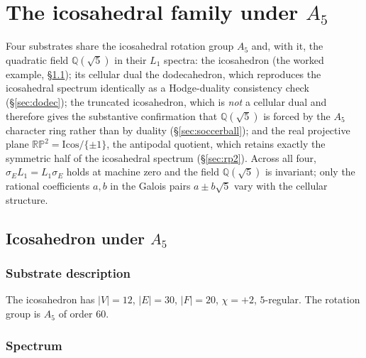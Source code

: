 \documentclass[12pt,a4paper]{article}
\theoremstyle{definition}
\theoremstyle{remark}
\newcommand{\bQ}{\mathbb{Q}}                %
\begin{document}
\section{The icosahedral family under $A_5$}\label{sec:dh-a5-family}

Four substrates share the icosahedral rotation group $A_5$ and, with it,
the quadratic field $\bQ(\sqrt 5)$ in their $L_1$ spectra: the icosahedron
(the worked example, \S\ref{sec:icos}); its cellular dual the dodecahedron,
which reproduces the icosahedral spectrum identically as a Hodge-duality
consistency check (\S\ref{sec:dodec}); the truncated icosahedron, which is
\emph{not} a cellular dual and therefore gives the substantive confirmation
that $\bQ(\sqrt 5)$ is forced by the $A_5$ character ring rather than by
duality (\S\ref{sec:soccerball}); and the real projective plane
$\mathbb{RP}^2 = \mathrm{Icos}/\{\pm 1\}$, the antipodal quotient, which
retains exactly the symmetric half of the icosahedral spectrum
(\S\ref{sec:rp2}). Across all four, $\sigma_E L_1 = L_1 \sigma_E$ holds at
machine zero and the field $\bQ(\sqrt 5)$ is invariant; only the rational
coefficients $a, b$ in the Galois pairs $a \pm b\sqrt 5$ vary with the
cellular structure.

\subsection{Icosahedron under $A_5$}\label{sec:icos}

\subsubsection{Substrate description}\label{sec:icos-description}

The icosahedron has $|V| = 12$, $|E| = 30$, $|F| = 20$, $\chi = +2$,
$5$-regular. The rotation group is $A_5$ of order $60$.

\subsubsection{Spectrum}\label{sec:icos-spectrum}
\end{document}
